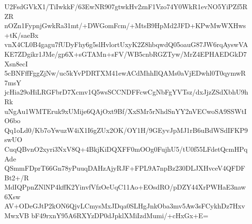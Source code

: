 U2FsdGVkX1/TiIwkkF/63EwNR907gtwkHv2znF1Vzo74Y0WkR1evNO5YiPZf5RZR
nOZn1FypnjGwkRa31mt/+DWGomFcm/+MtsB9HpMd2JFD+KPwMwWXHws+tK/saeBx
vnX4CL0B4gagu7fUDyFhy6g5slHvlortUxyK2Z8hbqwdQ05oauG87JW6rqAyswVA
KE7ZDgikr1JMe/gp6X+sGTAMn+sFV/WB5cnbRGZTyw/MrZ4EPHAEDGkD7Xsn8ecI
5cBNFffFggZjNw/uc5kYvPDRTXM41ewACdMhhIlQAMs0aVjEDwhl0T0qymwR7msY
jcHia29oHiLRGFbrD7Xcmv1Q5wsSCCNDFFcwCgNbFgYVTsz/dxJjzZSdXbhU9hRk
uNgAu1WMTEruk9xUMije6QAjOxt9Bf/XxSMr5rNhdSnYY2nVECwoSA9SSWtIO6bo
Qq1oLd0/Kb7oYwuzW4iX1I6gZUx2OK/OY1H/9GEyvJpMJ1rB6uBdWSdIFKP9swUO
CuqQBvnO2xyri3NxV8Q+4BkjKiDQXFF0mOOg0FujhU5/tU0f55LFdetQcmHPqAde
QSmmFDprT66Gn78yPuuqDAHzAjyRJF+FPL9A7npBz230DLJXHvceV4QFDFBt2+/R
MdIQPpnZNlNP4kffK2YinvfVfzOeUqC11Ao+EOsdRO/pDZY44XrPWHaE3naw6Xsw
AV+ODeGJtP2kON6QjvLCmysMxJDqa0SLHgJnkOba3mv5Aw3sFCykhDz7HxvMwxVB
bF49rxnY95A6RXYzDP0dJpklXMiIzdMumi/+cHxGx+E=
